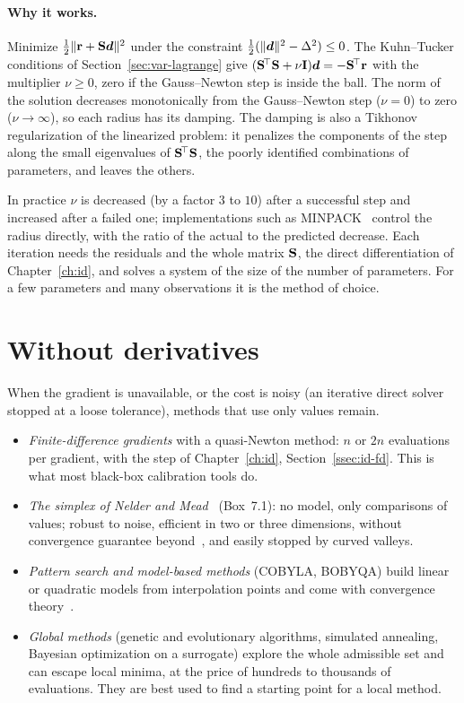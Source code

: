 \paragraph{Why it works.} Minimize $\tfrac12\lVert \mathbf{r}+\mathbf{S}\bm{d}\rVert^2$ under the
constraint $\tfrac12(\lVert \bm{d}\rVert^2-\Delta^2)\le0$. The Kuhn--Tucker conditions of
Section~\ref{sec:var-lagrange} give
$(\mathbf{S}^{\!\top}\mathbf{S}+\nu\mathbf{I})\bm{d}=-\mathbf{S}^{\!\top}\mathbf{r}$ with the multiplier $\nu\ge0$,
zero if the Gauss--Newton step is inside the ball. The norm of the solution
decreases monotonically from the Gauss--Newton step ($\nu=0$) to zero
($\nu\to\infty$), so each radius has its damping. The damping is also a Tikhonov
regularization of the linearized problem: it penalizes the components of the step
along the small eigenvalues of $\mathbf{S}^{\!\top}\mathbf{S}$, the poorly identified
combinations of parameters, and leaves the others.

In practice $\nu$ is decreased (by a factor $3$ to $10$) after a successful step
and increased after a failed one; implementations such as MINPACK~\cite{More1978}
control the radius directly, with the ratio of the actual to the predicted
decrease. Each iteration needs the residuals and the whole matrix $\mathbf{S}$, the
direct differentiation of Chapter~\ref{ch:id}, and solves a system of the size of
the number of parameters. For a few parameters and many observations it is the
method of choice.

\section{Without derivatives}\label{sec:opt-free}
%
When the gradient is unavailable, or the cost is noisy (an iterative direct solver
stopped at a loose tolerance), methods that use only values remain.
\begin{itemize}
  \item \emph{Finite-difference gradients} with a quasi-Newton method: $n$ or $2n$
  evaluations per gradient, with the step of Chapter~\ref{ch:id},
  Section~\ref{ssec:id-fd}. This is what most black-box calibration tools do.
  \item \emph{The simplex of Nelder and Mead}~\cite{NelderMead1965b} (Box~7.1): no
  model, only comparisons of values; robust to noise, efficient in two or three
  dimensions, without convergence guarantee beyond~\cite{LagariasEtAl1998b}, and
  easily stopped by curved valleys.
  \item \emph{Pattern search and model-based methods} (COBYLA, BOBYQA) build
  linear or quadratic models from interpolation points and come with convergence
  theory~\cite{ConnScheinbergVicente2009}.
  \item \emph{Global methods} (genetic and evolutionary algorithms, simulated
  annealing, Bayesian optimization on a surrogate) explore the whole admissible set
  and can escape local minima, at the price of hundreds to thousands of
  evaluations. They are best used to find a starting point for a local method.
\end{itemize}

